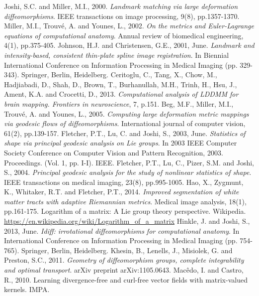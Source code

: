 \documentclass{article}
\theoremstyle{definition}
\theoremstyle{plain}
\begin{document}
\begin{thebibliography}{99} 
Joshi, S.C. and Miller, M.I., 2000. \textit{Landmark matching via large deformation diffeomorphisms}. IEEE transactions on image processing, 9(8), pp.1357-1370.
Miller, M.I., Trouvé, A. and Younes, L., 2002. \textit{On the metrics and Euler-Lagrange equations of computational anatomy}. Annual review of biomedical engineering, 4(1), pp.375-405.
Johnson, H.J. and Christensen, G.E., 2001, June. \textit{Landmark and intensity-based, consistent thin-plate spline image registration}. In Biennial International Conference on Information Processing in Medical Imaging (pp. 329-343). Springer, Berlin, Heidelberg.
Ceritoglu, C., Tang, X., Chow, M., Hadjiabadi, D., Shah, D., Brown, T., Burhanullah, M.H., Trinh, H., Hsu, J., Ament, K.A. and Crocetti, D., 2013. \textit{Computational analysis of LDDMM for brain mapping. Frontiers in neuroscience}, 7, p.151.
Beg, M.F., Miller, M.I., Trouvé, A. and Younes, L., 2005. \textit{Computing large deformation metric mappings via geodesic flows of diffeomorphisms}. International journal of computer vision, 61(2), pp.139-157.
Fletcher, P.T., Lu, C. and Joshi, S., 2003, June. \textit{Statistics of shape via principal geodesic analysis on Lie groups}. In 2003 IEEE Computer Society Conference on Computer Vision and Pattern Recognition, 2003. Proceedings. (Vol. 1, pp. I-I). IEEE.
Fletcher, P.T., Lu, C., Pizer, S.M. and Joshi, S., 2004. \textit{Principal geodesic analysis for the study of nonlinear statistics of shape}. IEEE transactions on medical imaging, 23(8), pp.995-1005.
Hao, X., Zygmunt, K., Whitaker, R.T. and Fletcher, P.T., 2014. \textit{Improved segmentation of white matter tracts with adaptive Riemannian metrics}. Medical image analysis, 18(1), pp.161-175.
Logarithm of a matrix: A Lie group theory perspective. Wikipedia. \url{https://en.wikipedia.org/wiki/Logarithm_of_a_matrix}
Hinkle, J. and Joshi, S., 2013, June. \textit{Idiff: irrotational diffeomorphisms for computational anatomy}. In International Conference on Information Processing in Medical Imaging (pp. 754-765). Springer, Berlin, Heidelberg.
Khesin, B., Lenells, J., Misiolek, G. and Preston, S.C., 2011. \textit{Geometry of diffeomorphism groups, complete integrability and optimal transport}. arXiv preprint arXiv:1105.0643.
Macêdo, I. and Castro, R., 2010. Learning divergence-free and curl-free vector fields with matrix-valued kernels. IMPA.
\end{thebibliography}
\end{document}
